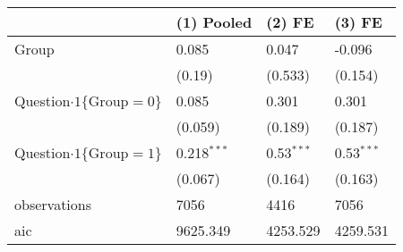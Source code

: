 \begin{tabular}{llll}
\hline
 & (1) Pooled & (2) FE & (3) FE \\
\hline
Group & 0.085 & 0.047 & -0.096 \\
 & (0.19) & (0.533) & (0.154) \\
Question$\cdot1\{\text{Group}=0\}$ & 0.085 & 0.301 & 0.301 \\
 & (0.059) & (0.189) & (0.187) \\
Question$\cdot1\{\text{Group}=1\}$ & 0.218$^{***}$ & 0.53$^{***}$ & 0.53$^{***}$ \\
 & (0.067) & (0.164) & (0.163) \\\hline

observations & 7056 & 4416 & 7056 \\
aic & 9625.349 & 4253.529 & 4259.531 \\
\hline
\end{tabular}
